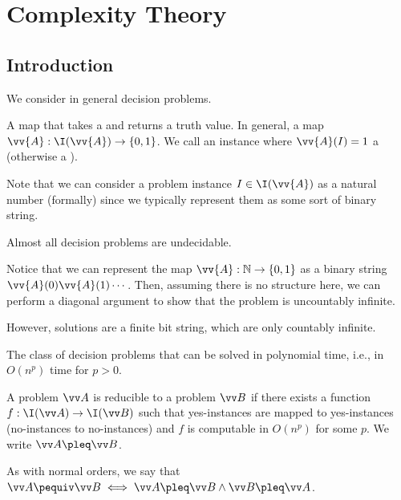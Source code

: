 \chapter{Complexity Theory}

\section{Introduction}

We consider in general decision problems.

\begin{defn}
  A map that takes a 
  and returns a truth value.
  In general, a map $\vv{A} : \I(\vv{A}) \to \{0,1\}$.
  We call an instance where $\vv{A}(I) = 1$ a 
  (otherwise a ).
\end{defn}

Note that we can consider a problem instance $I \in \I(\vv{A})$
as a natural number (formally) since we typically
represent them as some sort of binary string.

\begin{prop}
  Almost all decision problems are undecidable.
\end{prop}
\begin{prf}
  Notice that we can represent the map $\vv{A} : \N \to \{0,1\}$
  as a binary string $\vv{A}(0)\vv{A}(1)\cdots$.
  Then, assuming there is no structure here,
  we can perform a diagonal argument to show that
  the problem is uncountably infinite.

  However, solutions are a finite bit string,
  which are only countably infinite.
\end{prf}

\begin{defn}[\P]
  The class of decision problems that can be solved in polynomial time,
  i.e., in $O(n^p)$ time for $p > 0$.
\end{defn}

\begin{defn}
  A problem $\vv A$ is reducible to a problem $\vv B$
  if there exists a function $f : \I(\vv A) \to \I(\vv B)$
  such that yes-instances are mapped to yes-instances
  (no-instances to no-instances)
  and $f$ is computable in $O(n^p)$ for some $p$.
  We write $\vv A \pleq \vv B$.
\end{defn}

As with normal orders, we say that
$\vv A \pequiv \vv B \iff \vv A \pleq \vv B \land \vv B \pleq \vv A$.

